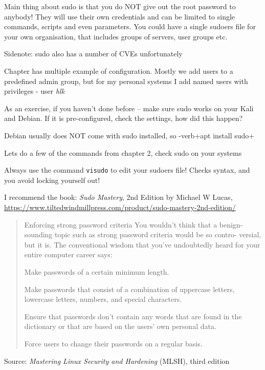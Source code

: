 \documentclass[Screen16to9,17pt]{foils}
\begin{document}

Main thing about sudo is that you do NOT give out the root password to anybody! They will use their own credentials and can be limited to single commands, scripts and even parameters. You could have a single sudoers file for your own organisation, that includes groups of servers, user groups etc.

Sidenote: sudo also has a number of CVEs unfortunately



Chapter has multiple example of configuration. Mostly we add users to a predefined admin group, but for my personal systems I add named users with privileges - user \emph{hlk}

As an exercise, if you haven't done before -- make sure sudo works on your Kali and Debian. If it is pre-configured, check the settings, how did this happen?

Debian usually does NOT come with sudo installed, so -verb+apt install sudo+

\begin{list2}
\item Lets do a few of the commands from chapter 2, check sudo on your systems
\item Always use the command \verb+visudo+ to edit your sudoers file! Checks syntax, and you avoid locking yourself out!
\item I recommend the book: \emph{Sudo Mastery}, 2nd Edition by Michael W Lucas, \\
    \url{https://www.tiltedwindmillpress.com/product/sudo-mastery-2nd-edition/}
\end{list2}



\begin{quote}
Enforcing strong password criteria
You wouldn’t think that a benign-sounding topic such as strong password criteria would be so contro-
versial, but it is. The conventional wisdom that you’ve undoubtedly heard for your entire computer
career says:

\begin{list2}
\item Make passwords of a certain minimum length.
\item Make passwords that consist of a combination of uppercase letters, lowercase letters, numbers,
and special characters.
\item Ensure that passwords don’t contain any words that are found in the dictionary or that are
based on the users’ own personal data.
\item Force users to change their passwords on a regular basis.
\end{list2}
\end{quote}
Source: \emph{Mastering Linux Security and Hardening} (MLSH), third edition
\end{document}
